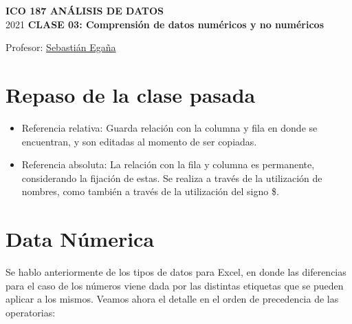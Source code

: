 \documentclass[12 pt,letterpaper]{article}
\begin{document}
%

	
	\pagestyle{fancy}
	\fancyhf{}
	\renewcommand{\headrulewidth}{0pt}
	\renewcommand{\footrulewidth}{0pt}	
	
\begin{center}
		
	\bigbreak
	\textbf{ICO 187 ANÁLISIS DE DATOS}\\
	\small{2021}
	\break
	\textbf{CLASE 03: Comprensión de datos numéricos y no numéricos}\\
\end{center}

\begin{flushright}	
		
	Profesor: \href{mailto:sebastianeganasa@santotomas.cl}{Sebastián Egaña}

\end{flushright}

\section{Repaso de la clase pasada}

\begin{itemize}
	\item Referencia relativa: Guarda relación con la columna y fila en donde se encuentran, y son editadas al momento de ser copiadas.
	
	\item Referencia absoluta: La relación con la fila y columna es permanente, considerando la fijación de estas. Se realiza a través de la utilización de nombres, como también a través de la utilización del signo \$.
\end{itemize}
	

\section{Data Númerica}

Se hablo anteriormente de los tipos de datos para Excel, en donde las diferencias para el caso de los números viene dada por las distintas etiquetas que se pueden aplicar a los mismos. Veamos ahora el detalle en el orden de precedencia de las operatorias:
\end{document}
